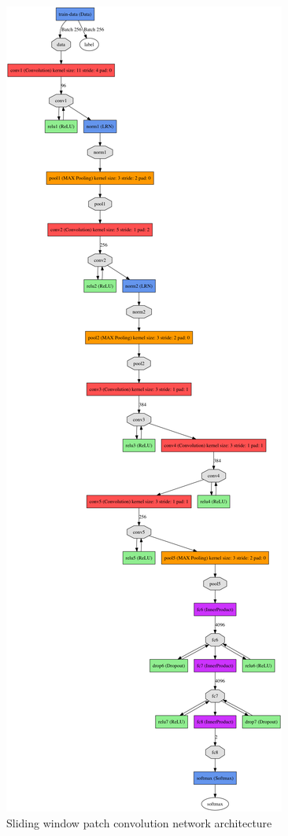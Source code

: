 \documentclass[conference,a4paper]{ieeetran}
\begin{document}
\begin{figure}[!b]
	\centering
  	\includegraphics[width=0.85\linewidth]{figures/alexnet.png}
	\caption{Sliding window patch convolution network architecture}
  	\label{fig:alexnet}
\end{figure}
\end{document}
